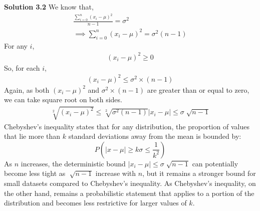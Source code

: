 \begin{tcolorbox}[breakable]
\begin{sol}
		\textbf{Solution 3.2}
		We know that,
		\begin{align*}
			\frac{\sum^n_{i=0}(x_i-\mu)^2}{n-1}=\sigma^2 \\
			\implies \sum^n_{i=0}(x_i-\mu)^2 = \sigma^2(n-1)
		\end{align*}
		For any $i$,
		\begin{align*}
			(x_i-\mu)^2\geq0
		\end{align*}
		So, for each $i$,
		\begin{align*}
			(x_i-\mu)^2\leq\sigma^2\times(n-1)
		\end{align*}
		Again, as both $(x_i-\mu)^2$ and $\sigma^2\times(n-1)$ are greater than or equal to zero, we can take square root on both sides.
		\begin{align*}
			\sqrt[2]{(x_i-\mu)^2}\leq\sqrt[2]{\sigma^2(n-1)}
			|x_i-\mu|\leq\sigma\sqrt[]{n-1}
		\end{align*}
		Chebyshev's inequality states that for any distribution, the proportion of values that lie more than $k$ standard deviations away from the mean is bounded by:
		\[P(|x-\mu | \geq k\sigma\leq \frac{1}{k^2})\]
		As $n$ increases, the deterministic bound $|x_i-\mu|\leq \sigma\sqrt[]{n-1}$ can potentially become less tight as $\sqrt[]{n-1}$ increase with $n$, but it remains a stronger bound for small datasets compared to Chebyshev's inequality. As Chebyshev's inequality, on the other hand, remains a probabilistic statement that applies to a portion of the distribution and becomes less restrictive for larger values of $k$.
	\end{sol}
\end{tcolorbox}
